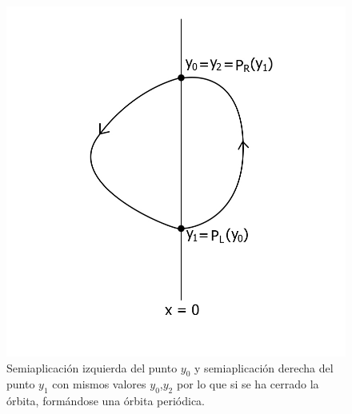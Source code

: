 \documentclass[12pt,a4paper]{report} %
\begin{document}
	\begin{figure}[h]
		\centering
 		\includegraphics[width=1.1\textwidth,center]{aplipoincareLRcerrado.jpg}
		\caption{Semiaplicación izquierda del punto $y_0$ y semiaplicación derecha del punto $y_1$ con mismos valores $y_0$,$y_2$ por lo que si se ha cerrado la órbita, formándose una órbita periódica.}
		\label{fig:aplipoincareLRcerrado}
	\end{figure}\smallskip
	
	\newpage
	
\end{document}
